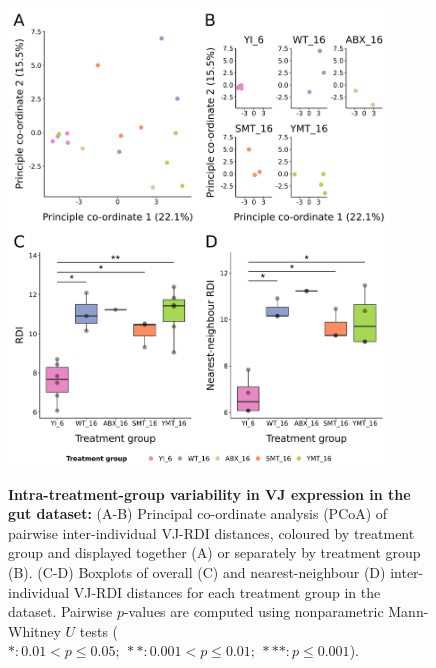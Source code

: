 \begin{figure}
\centering
\includegraphics[width = 0.9\textwidth]{_Figures/png/igseq-gut-rdi-VJ-individual-group}
\begin{subfigure}{0em}
\label{fig:igseq-gut-rdi-VJ-individual-group-pcoa-all}
\end{subfigure}
\begin{subfigure}{0em}
\label{fig:igseq-gut-rdi-VJ-individual-group-pcoa-facet}
\end{subfigure}
\begin{subfigure}{0em}
\label{fig:igseq-gut-rdi-VJ-individual-group-groupdist-all}
\end{subfigure}
\begin{subfigure}{0em}
\label{fig:igseq-gut-rdi-VJ-individual-group-groupdist-nn}
\end{subfigure}
\caption[Intra-treatment-group variability in VJ expression in the \igseq gut dataset]{\textbf{Intra-treatment-group variability in VJ expression in the \igseq gut dataset:} (A-B) Principal co-ordinate analysis (PCoA) of pairwise inter-individual VJ-RDI distances, coloured by treatment group and displayed together (A) or separately by treatment group (B). (C-D) Boxplots of overall (C) and nearest-neighbour (D) inter-individual VJ-RDI distances for each treatment group in the dataset. Pairwise $p$-values are computed using nonparametric Mann-Whitney $U$ tests ($*: 0.01 < p \leq 0.05;~**: 0.001 < p \leq 0.01;~***: p \leq 0.001$).}
\label{fig:igseq-gut-rdi-VJ-individual-group}
\end{figure}

